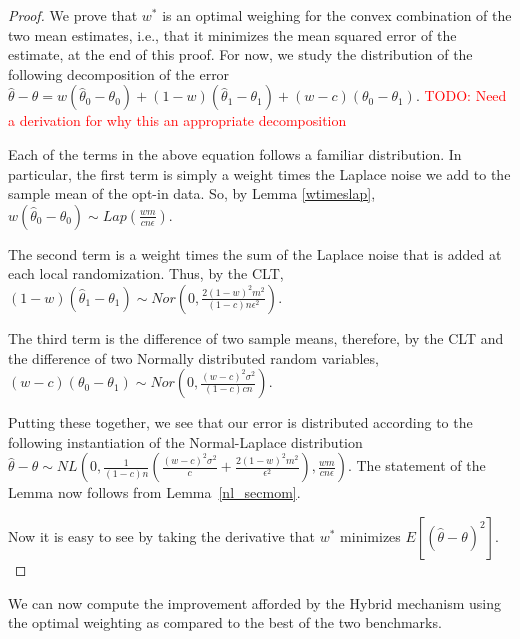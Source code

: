\documentclass{article}
\newcommand\TODO[1]{\textcolor{red}{TODO: {#1}}}
\theoremstyle{plain}
\begin{document}
\begin{proof}
We prove that $w^*$ is an optimal weighing for the convex combination of the two mean estimates, i.e., that it minimizes the mean squared error of the estimate, at the end of this proof. For now, we study the distribution of the following decomposition of the error
$\hat{\theta} - \theta = w(\hat{\theta}_0 - \theta_0) + (1-w)(\hat{\theta}_1 - \theta_1) + (w-c)(\theta_0 - \theta_1).$ \TODO{Need a derivation for why this an appropriate decomposition}

Each of the terms in the above equation follows a familiar distribution. In particular, the first term is simply a weight times the Laplace noise we add to the sample mean of the opt-in data. So, by Lemma \ref{wtimeslap},
$w(\hat{\theta}_0 - \theta_0) \sim Lap\left(\frac{wm}{cn\epsilon}\right).$

The second term is a weight times the sum of the Laplace noise that is added at each local randomization. Thus, by the CLT,
$(1-w)(\hat{\theta}_1 - \theta_1) \sim Nor\left(0, \frac{2(1-w)^2 m^2}{(1-c)n\epsilon^2}\right).$

The third term is the difference of two sample means, therefore, by the CLT and the difference of two Normally distributed random variables, 
$(w-c)(\theta_0 - \theta_1) \sim Nor\left(0, \frac{(w-c)^2\sigma^2}{(1-c)cn}\right).$

Putting these together, we see that our error is distributed according to the following instantiation of the Normal-Laplace distribution
$\hat{\theta} - \theta \sim NL\left(0, \frac{1}{(1-c)n}\left(\frac{(w-c)^2\sigma^2}{c} + \frac{2(1-w)^2 m^2}{\epsilon^2}\right), \frac{wm}{cn\epsilon}\right).$ The statement of the Lemma now follows from Lemma~\ref{nl_secmom}.

Now it is easy to see by taking the derivative that $w^*$ minimizes $E[(\hat{\theta} - \theta)^2].$
\end{proof}


We can now compute the improvement afforded by the Hybrid mechanism using the optimal weighting as compared to the best of the two benchmarks. %
\end{document}
